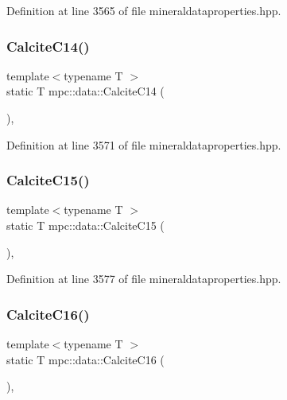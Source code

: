 Definition at line 3565 of file mineraldataproperties.\+hpp.

\mbox{\label{namespacempc_1_1data_a31115e5f7f561369f25f8c5bedd07d53}} 
\subsubsection{\texorpdfstring{Calcite\+C14()}{CalciteC14()}}
{\footnotesize\ttfamily template$<$typename T $>$ \\
static T mpc\+::data\+::\+Calcite\+C14 (\begin{DoxyParamCaption}{ }\end{DoxyParamCaption})\hspace{0.3cm}{\ttfamily [inline]}, {\ttfamily [static]}}



Definition at line 3571 of file mineraldataproperties.\+hpp.

\mbox{\label{namespacempc_1_1data_a744474e954f79985c9cab1cdece87124}} 
\subsubsection{\texorpdfstring{Calcite\+C15()}{CalciteC15()}}
{\footnotesize\ttfamily template$<$typename T $>$ \\
static T mpc\+::data\+::\+Calcite\+C15 (\begin{DoxyParamCaption}{ }\end{DoxyParamCaption})\hspace{0.3cm}{\ttfamily [inline]}, {\ttfamily [static]}}



Definition at line 3577 of file mineraldataproperties.\+hpp.

\mbox{\label{namespacempc_1_1data_acb7947ab48e961a18a0c2ea2bba66004}} 
\subsubsection{\texorpdfstring{Calcite\+C16()}{CalciteC16()}}
{\footnotesize\ttfamily template$<$typename T $>$ \\
static T mpc\+::data\+::\+Calcite\+C16 (\begin{DoxyParamCaption}{ }\end{DoxyParamCaption})\hspace{0.3cm}{\ttfamily [inline]}, {\ttfamily [static]}}



